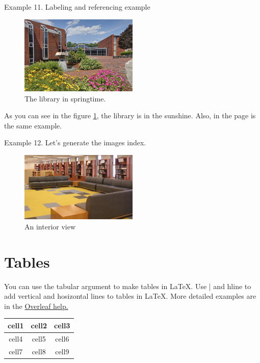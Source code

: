 \documentclass{article}
\begin{document}
\newpage

Example 11. Labeling and referencing example
\begin{figure}[h]
    \centering
    \includegraphics[width=0.5\textwidth]{flowers}
    \caption{The library in springtime.}
    \label{fig:library}
\end{figure}

As you can see in the figure \ref{fig:library}, the library is in the sunshine. Also, in the page \pageref{fig:library} is the same example.

\vspace{1.5cm}

Example 12. Let's generate the images index.
\begin{figure}[h]
    \centering
    \includegraphics[width=0.5\textwidth]{stacks}
    \caption{An interior view}
    \label{fig:inside}
\end{figure}

\newpage

\listoffigures

\section{Tables}
You can use the tabular argument to make tables in \LaTeX.  Use | and hline to add vertical and hosizontal lines to tables in \LaTeX.  More detailed examples are in the \href{https://www.overleaf.com/learn/latex/Tables}{Overleaf help.}

\begin{center}
\begin{tabular}{ c | c  c }
 cell1 & cell2 & cell3 \\
 \hline
 cell4 & cell5 & cell6 \\
 cell7 & cell8 & cell9
\end{tabular}
\end{center}
\end{document}
